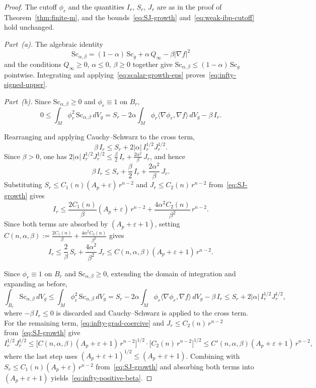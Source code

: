 \documentclass[12pt,oneside,a4paper]{article}
\theoremstyle{mytheorem}
\theoremstyle{remark}
\begin{document}
\begin{proof}
The cutoff $\phi_r$ and the quantities $I_r$, $S_r$, $J_r$ are as in
the proof of Theorem~\ref{thm:finite-m}, and the bounds~\eqref{eq:SJ-growth}
and~\eqref{eq:weak-ibp-cutoff} hold unchanged.

\textit{Part~\textup{(a)}.}
The algebraic identity
\[
  \mathrm{Sc}_{\alpha,\beta}
  =(1-\alpha)\,\mathrm{Sc}_g+\alpha\,Q_\infty-\beta|\nabla f|^2
\]
and the conditions $Q_\infty\ge 0$, $\alpha\le 0$, $\beta\ge 0$ together
give $\mathrm{Sc}_{\alpha,\beta}\le(1-\alpha)\,\mathrm{Sc}_g$ pointwise.
Integrating and applying~\eqref{eq:scalar-growth-eps}
proves~\eqref{eq:infty-signed-upper}. 

\textit{Part~\textup{(b)}.}
Since $\mathrm{Sc}_{\alpha,\beta}\ge 0$ and $\phi_r\equiv 1$ on $B_r$,
\[
  0
  \le\int_M\phi_r^2\,\mathrm{Sc}_{\alpha,\beta}\,dV_g
  =S_r
   -2\alpha\int_M\phi_r\langle\nabla\phi_r,\nabla f\rangle\,dV_g
   -\beta\,I_r.
\]



Rearranging and applying Cauchy--Schwarz to the cross term,
\[
  \beta\,I_r
  \le S_r + 2|\alpha|\,I_r^{1/2}J_r^{1/2}.
\]
Since $\beta>0$, one has 
$2|\alpha|\,I_r^{1/2}J_r^{1/2} \le \tfrac{\beta}{2}\,I_r
+ \tfrac{2\alpha^2}{\beta}\,J_r$, and hence
\[
  \beta\,I_r \le S_r + \frac{\beta}{2}\,I_r + \frac{2\alpha^2}{\beta}\,J_r.
\]
 Substituting
$S_r \le C_1(n)(A_p+\varepsilon)\,r^{n-2}$ and
$J_r \le C_2(n)\,r^{n-2}$ from~\eqref{eq:SJ-growth} gives
\[
  I_r
  \le \frac{2C_1(n)}{\beta}(A_p+\varepsilon)\,r^{n-2}
    + \frac{4\alpha^2 C_2(n)}{\beta^2}\,r^{n-2}.
\]
Since both terms are absorbed by $(A_p+\varepsilon+1)$, setting
$C(n,\alpha,\beta) :=\tfrac{2C_1(n)}{\beta} +
\tfrac{4\alpha^2 C_2(n)}{\beta^2}$ gives
\begin{equation}\label{eq:infty-grad-coercive}
  I_r
  \le \frac{2}{\beta}\,S_r + \frac{4\alpha^2}{\beta^2}\,J_r
  \le C(n,\alpha,\beta)(A_p+\varepsilon+1)\,r^{n-2}.
\end{equation}

Since $\phi_r\equiv 1$ on $B_r$ and $\mathrm{Sc}_{\alpha,\beta}\ge 0$,
extending the domain of integration and expanding as before,
\[
  \int_{B_r}\mathrm{Sc}_{\alpha,\beta}\,dV_g
  \le\int_M\phi_r^2\,\mathrm{Sc}_{\alpha,\beta}\,dV_g
  = S_r
    - 2\alpha\int_M\phi_r\langle\nabla\phi_r,\nabla f\rangle\,dV_g
    - \beta\,I_r
  \le S_r + 2|\alpha|\,I_r^{1/2}J_r^{1/2},
\]
where $-\beta\,I_r\le 0$ is discarded and Cauchy--Schwarz is applied to
the cross term. For the remaining term, \eqref{eq:infty-grad-coercive}
and $J_r\le C_2(n)\,r^{n-2}$ from~\eqref{eq:SJ-growth} give
\[
  I_r^{1/2}J_r^{1/2}
  \le \bigl[C(n,\alpha,\beta)(A_p+\varepsilon+1)\,r^{n-2}\bigr]^{1/2}
     \cdot\bigl[C_2(n)\,r^{n-2}\bigr]^{1/2}
  \le C'(n,\alpha,\beta)(A_p+\varepsilon+1)\,r^{n-2},
\]
where the last step uses $(A_p+\varepsilon+1)^{1/2}\le(A_p+\varepsilon+1)$.
Combining with $S_r\le C_1(n)(A_p+\varepsilon)\,r^{n-2}$
from~\eqref{eq:SJ-growth} and absorbing both terms
into $(A_p+\varepsilon+1)$ yields~\eqref{eq:infty-positive-beta}.
\end{proof}
\end{document}
